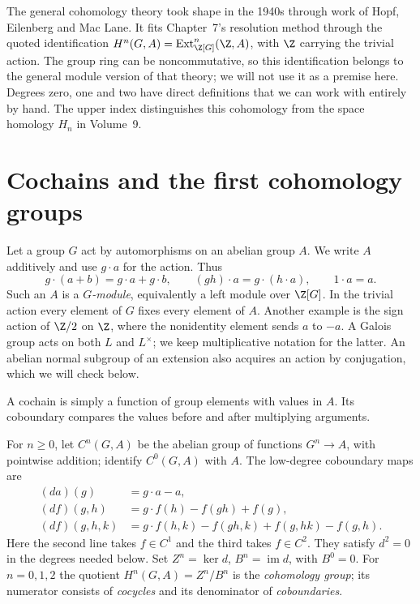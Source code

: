 The general cohomology theory took shape in the 1940s through work of Hopf, Eilenberg and Mac Lane. It fits Chapter~7's resolution method through the quoted identification
$H^n(G,A)=\operatorname{Ext}^n_{\Z[G]}(\Z,A)$, with $\Z$ carrying the trivial action. The group ring can be noncommutative, so this identification belongs to the general module version of that theory; we will not use it as a premise here. Degrees zero, one and two have direct definitions that we can work with entirely by hand. The upper index distinguishes this cohomology from the space homology $H_n$ in Volume~9.

\section{Cochains and the first cohomology groups}

Let a group $G$ act by automorphisms on an abelian group $A$. We write $A$ additively and use $g\cdot a$ for the action. Thus
\[
g\cdot(a+b)=g\cdot a+g\cdot b,\qquad
(gh)\cdot a=g\cdot(h\cdot a),\qquad1\cdot a=a.
\]
Such an $A$ is a \emph{$G$-module}, equivalently a left module over $\Z[G]$. In the trivial action every element of $G$ fixes every element of $A$. Another example is the sign action of $\Z/2$ on $\Z$, where the nonidentity element sends $a$ to $-a$. A Galois group acts on both $L$ and $L^\times$; we keep multiplicative notation for the latter. An abelian normal subgroup of an extension also acquires an action by conjugation, which we will check below.

A cochain is simply a function of group elements with values in $A$. Its coboundary compares the values before and after multiplying arguments.

\begin{definition}\label{def:cochains}
For $n\ge0$, let $C^n(G,A)$ be the abelian group of functions $G^n\to A$, with pointwise addition; identify $C^0(G,A)$ with $A$. The low-degree coboundary maps are
\[
\begin{aligned}
(da)(g)&=g\cdot a-a,\\
(df)(g,h)&=g\cdot f(h)-f(gh)+f(g),\\
(df)(g,h,k)&=g\cdot f(h,k)-f(gh,k)+f(g,hk)-f(g,h).
\end{aligned}
\]
Here the second line takes $f\in C^1$ and the third takes $f\in C^2$. They satisfy $d^2=0$ in the degrees needed below. Set
$Z^n=\ker d$, $B^n=\operatorname{im}d$, with $B^0=0$. For $n=0,1,2$ the quotient $H^n(G,A)=Z^n/B^n$ is the \emph{cohomology group}; its numerator consists of \emph{cocycles} and its denominator of \emph{coboundaries}.
\end{definition}

